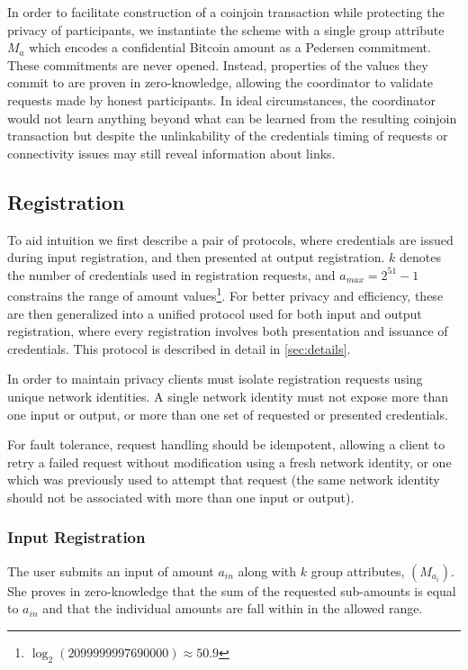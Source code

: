 \documentclass[a4paper]{article}
\begin{document}
In order to facilitate construction of a coinjoin transaction while protecting the privacy of participants, we instantiate the scheme with a single group attribute $M_a$ which encodes a confidential Bitcoin amount as a Pedersen commitment. These commitments are never opened. Instead, properties of the values they commit to are proven in zero-knowledge, allowing the coordinator to validate requests made by honest participants. In ideal circumstances, the coordinator would not learn anything beyond what can be learned from the resulting coinjoin transaction but despite the unlinkability of the credentials timing of requests or connectivity issues may still reveal information about links.

\subsection{Registration}

To aid intuition we first describe a pair of protocols, where credentials are issued during input registration, and then presented at output registration. $k$ denotes the number of credentials used in registration requests, and $a_{\mathit{max}} = 2^{51}-1$ constrains the range of amount values\footnote{$\log_2(2099999997690000) \approx 50.9$}. For better privacy and efficiency, these are then generalized into a unified protocol used for both input and output registration, where every registration involves both presentation and issuance of credentials. This protocol is described in detail in \cref{sec:details}.

In order to maintain privacy clients must isolate registration requests using unique network identities. A single network identity must not expose more than one input or output, or more than one set of requested or presented credentials.

For fault tolerance, request handling should be idempotent, allowing a client to retry a failed request without modification using a fresh network identity, or one which was previously used to attempt that request (the same network identity should not be associated with more than one input or output).

\subsubsection{Input Registration}

The user submits an input of amount $a_{\mathit{in}}$ along with $k$ group attributes, $(M_{a_i})$.
She proves in zero-knowledge that the sum of the requested sub-amounts is equal to $a_{\mathit{in}}$ and that the individual amounts are fall within in the allowed range.
\end{document}

